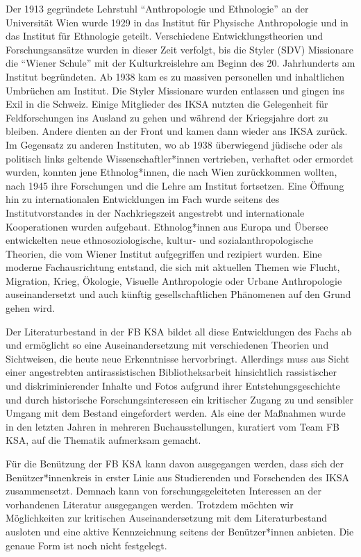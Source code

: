 \documentclass[a4paper,
fontsize=11pt,
oneside,
numbers=noperiodatend,
parskip=half-,
bibliography=totoc,
final
]{scrartcl}
\begin{document}
Der 1913 gegründete Lehrstuhl \enquote{Anthropologie und Ethnologie} an
der Universität Wien wurde 1929 in das Institut für Physische
Anthropologie und in das Institut für Ethnologie geteilt. Verschiedene
Entwicklungstheorien und Forschungsansätze wurden in dieser Zeit
verfolgt, bis die Styler (SDV) Missionare die \enquote{Wiener Schule}
mit der Kulturkreislehre am Beginn des 20. Jahrhunderts am Institut
begründeten. Ab 1938 kam es zu massiven personellen und inhaltlichen
Umbrüchen am Institut. Die Styler Missionare wurden entlassen und gingen
ins Exil in die Schweiz. Einige Mitglieder des IKSA nutzten die
Gelegenheit für Feldforschungen ins Ausland zu gehen und während der
Kriegsjahre dort zu bleiben. Andere dienten an der Front und kamen dann
wieder ans IKSA zurück. Im Gegensatz zu anderen Instituten, wo ab 1938
überwiegend jüdische oder als politisch links geltende
Wissenschaftler*innen vertrieben, verhaftet oder ermordet wurden,
konnten jene Ethnolog*innen, die nach Wien zurückkommen wollten, nach
1945 ihre Forschungen und die Lehre am Institut fortsetzen. Eine Öffnung
hin zu internationalen Entwicklungen im Fach wurde seitens des
Institutvorstandes in der Nachkriegszeit angestrebt und internationale
Kooperationen wurden aufgebaut. Ethnolog*innen aus Europa und Übersee
entwickelten neue ethnosoziologische, kultur- und sozialanthropologische
Theorien, die vom Wiener Institut aufgegriffen und rezipiert wurden.
Eine moderne Fachausrichtung entstand, die sich mit aktuellen Themen wie
Flucht, Migration, Krieg, Ökologie, Visuelle Anthropologie oder Urbane
Anthropologie auseinandersetzt und auch künftig gesellschaftlichen
Phänomenen auf den Grund gehen wird.

Der Literaturbestand in der FB KSA bildet all diese Entwicklungen des
Fachs ab und ermöglicht so eine Auseinandersetzung mit verschiedenen
Theorien und Sichtweisen, die heute neue Erkenntnisse hervorbringt.
Allerdings muss aus Sicht einer angestrebten antirassistischen
Bibliotheksarbeit hinsichtlich rassistischer und diskriminierender
Inhalte und Fotos aufgrund ihrer Entstehungsgeschichte und durch
historische Forschungsinteressen ein kritischer Zugang zu und sensibler
Umgang mit dem Bestand eingefordert werden. Als eine der Maßnahmen wurde
in den letzten Jahren in mehreren Buchausstellungen, kuratiert vom Team
FB KSA, auf die Thematik aufmerksam gemacht.

Für die Benützung der FB KSA kann davon ausgegangen werden, dass sich
der Benützer*innen\-kreis in erster Linie aus Studierenden und Forschenden
des IKSA zusammensetzt. Demnach kann von forschungsgeleiteten Interessen
an der vorhandenen Literatur ausgegangen werden. Trotzdem möchten wir
Möglichkeiten zur kritischen Auseinandersetzung mit dem Literaturbestand
ausloten und eine aktive Kennzeichnung seitens der Benützer*innen
anbieten. Die genaue Form ist noch nicht festgelegt.
\end{document}
